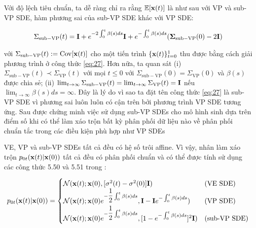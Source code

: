 \documentclass{article} %
\begin{document}
Với độ lệch tiêu chuẩn, ta dễ ràng chỉ ra rằng $\mathbb{E} \lbrack \bold{x}(t) \rbrack$ là như sau với VP và sub-VP SDE, hàm phương sai của sub-VP SDE khác với VP SDE:

\begin{equation} \label{eq:27}
    \Sigma_{\mathrm{sub-VP}}(t) = \bold{I} + e^{-2\int_{0}^t \beta(s)ds} \bold{I} + e^{-\int_{0}^t \beta(s)ds} (\bold{\Sigma}_{\mathrm{sub-VP}}(0) - 2 \bold{I})
\end{equation}

với $\Sigma_{\mathrm{sub-VP}}(t):=\mathrm{Cov} \lbrack \bold{x}(t) \rbrack$  cho một tiến trình $\lbrace \bold{x}(t) \rbrace_{t=0}^1$ thu được bằng cách giải phương trình ở công thức \ref{eq:27}.
Hơn nữa, ta quan sát (i) $\Sigma_{\mathrm{sub-VP}}(t) \prec \Sigma_{\mathrm{VP}}(t)$ với mọi $t \leq 0$ với $\Sigma_{\mathrm{sub-VP}}(0) = \Sigma_{\mathrm{VP}}(0)$ và $\beta(s)$ được chia sẻ;
(ii) $\lim_{t \rightarrow \infty} \Sigma_{\mathrm{sub-VP}}(t) = \lim_{t \rightarrow \infty} \Sigma_{\mathrm{VP}}(t) = \bold{I}$ nếu $\lim_{t\rightarrow \infty} \beta(s) ds = \infty$.
Đây là lý do vì sao ta đặt tên công thức \ref{eq:27} là sub-VP SDE vì phương sai luôn luôn có cận trên bởi phương trình VP SDE tương ứng.
Sau được chứng minh việc sử dụng sub-VP SDEs cho mô hình sinh dựa trên điểm số khi có thể làm xáo trộn bất kỳ phân phối dữ liệu nào về phân phối chuẩn tắc trong các điều kiện phù hợp như VP SDEs

VE, VP và sub-VP SDEs tất cả đều có hệ số trôi affine.
Vì vậy, nhân làm xáo trộn $p_{0t}(\bold{x}(t) \vert \bold{x}(0))$ tất cả đều có phân phối chuẩn và có thể được tính sử dụng các công thức 5.50 và 5.51 trong \citep{sarkka2019applied}:

\begin{equation} \label{eq:29}
    \begin{aligned}
        p_{0t}(\bold{x}(t) \vert \bold{x}(0)) = \begin{cases}
            \mathcal{N}(\bold{x}(t); \bold{x}(0), \lbrack \sigma^2(t) - \sigma^2(0) \rbrack \bold{I}) &(\text{VE SDE}) \\
            \mathcal{N}(\bold{x}(t); \bold{x}(0) e^{-\dfrac{1}{2}\int_0^t \beta(s)ds}, \bold{I} - \bold{I} e^{-\int_0^t \beta(s)ds}) &(\text{VP SDE}) \\
            \mathcal{N}(\bold{x}(t); \bold{x}(0) e^{-\dfrac{1}{2}\int_0^t \beta(s)ds}, \lbrack 1 - e^{-\int_0^t \beta(s) ds} \rbrack^2 \bold{I}) &(\text{sub-VP SDE})
        \end{cases}
    \end{aligned}
\end{equation}
\end{document}

